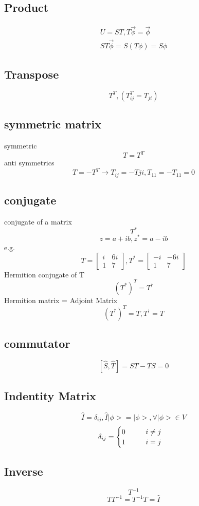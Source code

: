 \documentclass[12pt, a4paper]{article}
\newcommand{\tab}[1][1cm]{\hspace*{#1}}
\begin{document}
\subsection{Product}
\begin{align*}
U=ST, T\vec{\phi}=\vec{\phi}\\
ST\vec{\phi}=S(T\phi)=S\phi
\end{align*}

\subsection{Transpose}
$$T^T, (T^T_{ij}=T_{ji})$$

\subsection{symmetric matrix}
symmetric
$$T=T^T$$
anti symmetrics
$$T=-T^T \rightarrow T_{ij}=-T{ji}, T_{11}=-T_{11}=0$$

\subsection{conjugate}
conjugate of a matrix
$$T^*$$
$$z=a+ib, z^*=a-ib$$
e.g.
$$
T=
\begin{bmatrix}
i & 6i\\
1 & 7
\end{bmatrix}
,T^*=
\begin{bmatrix}
-i & -6i\\
1 & 7
\end{bmatrix}
$$
Hermition conjugate of T 
$$(T^*)^T=T^{\dagger}$$
Hermition matrix = Adjoint Matrix
$$(T^*)^T=T,T^{\dagger}=T$$

\subsection{commutator}
$$[\hat{S},\hat{T}]=ST-TS=0$$

\subsection{Indentity Matrix}
$$\hat{I}=\delta_{ij},\hat{I}|\phi>=|\phi>, \forall	|\phi>\in V$$
$$
\delta_{ij}=
\begin{cases}
0\tab i \not = j\\
1\tab i = j
\end{cases}
$$

\subsection{Inverse}
$$T^{-1}$$
$$TT^{-1}=T^{-1}T=\hat{I}$$
\end{document}
